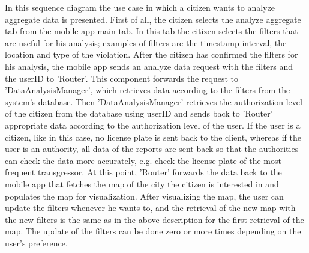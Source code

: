 In this sequence diagram the use case in which a citizen wants to analyze aggregate data is presented. First of all, the citizen selects the analyze aggregate tab from the mobile app main tab. In this tab the citizen selects the filters that are useful for his analysis; examples of filters are the timestamp interval, the location 	and type of the violation. After the citizen has confirmed the filters for his analysis, the mobile app sends an analyze data request with the filters and the userID to 'Router'. This component forwards the request to 'DataAnalysisManager', which retrieves data according to the filters from the system's database. Then 'DataAnalysisManager' retrieves the authorization level of the citizen from the database using userID and sends back to 'Router' appropriate data according to the authorization level of the user. If the user is a citizen, like in this case, no license plate is sent back to the client, whereas if the user is an authority, all data of the reports are sent back so that the authorities can check the data more accurately, e.g. check the license plate of the most frequent transgressor. At this point, 'Router' forwards the data back to the mobile app that fetches the map of the city the citizen is interested in and populates the map for visualization. After visualizing the map, the user can update the filters whenever he wants to, and the retrieval of the new map with the new filters is the same as in the above description for the first retrieval of the map. The update of the filters can be done zero or more times depending on the user's preference.

